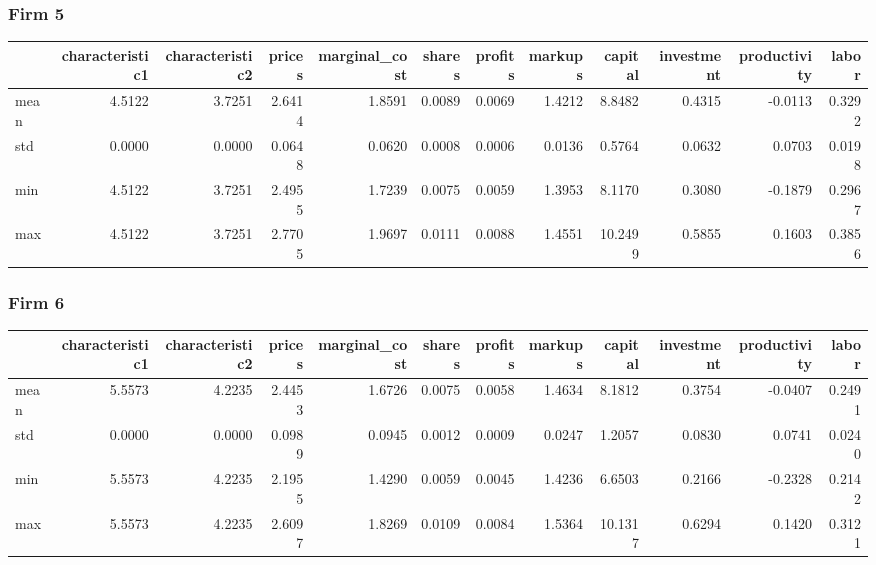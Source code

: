  \subsubsection*{Firm 5}
\begin{tabular}{lrrrrrrrrrrr}
\toprule
{} &  characteristic1 &  characteristic2 &  prices &  marginal\_cost &  shares &  profits &  markups &  capital &  investment &  productivity &  labor \\
\midrule
mean &           4.5122 &           3.7251 &  2.6414 &         1.8591 &  0.0089 &   0.0069 &   1.4212 &   8.8482 &      0.4315 &       -0.0113 & 0.3292 \\
std  &           0.0000 &           0.0000 &  0.0648 &         0.0620 &  0.0008 &   0.0006 &   0.0136 &   0.5764 &      0.0632 &        0.0703 & 0.0198 \\
min  &           4.5122 &           3.7251 &  2.4955 &         1.7239 &  0.0075 &   0.0059 &   1.3953 &   8.1170 &      0.3080 &       -0.1879 & 0.2967 \\
max  &           4.5122 &           3.7251 &  2.7705 &         1.9697 &  0.0111 &   0.0088 &   1.4551 &  10.2499 &      0.5855 &        0.1603 & 0.3856 \\
\bottomrule
\end{tabular}


 \subsubsection*{Firm 6}
\begin{tabular}{lrrrrrrrrrrr}
\toprule
{} &  characteristic1 &  characteristic2 &  prices &  marginal\_cost &  shares &  profits &  markups &  capital &  investment &  productivity &  labor \\
\midrule
mean &           5.5573 &           4.2235 &  2.4453 &         1.6726 &  0.0075 &   0.0058 &   1.4634 &   8.1812 &      0.3754 &       -0.0407 & 0.2491 \\
std  &           0.0000 &           0.0000 &  0.0989 &         0.0945 &  0.0012 &   0.0009 &   0.0247 &   1.2057 &      0.0830 &        0.0741 & 0.0240 \\
min  &           5.5573 &           4.2235 &  2.1955 &         1.4290 &  0.0059 &   0.0045 &   1.4236 &   6.6503 &      0.2166 &       -0.2328 & 0.2142 \\
max  &           5.5573 &           4.2235 &  2.6097 &         1.8269 &  0.0109 &   0.0084 &   1.5364 &  10.1317 &      0.6294 &        0.1420 & 0.3121 \\
\bottomrule
\end{tabular}


